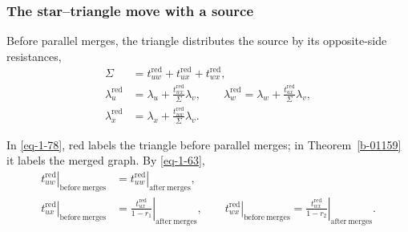 \documentclass[11pt]{article}
\numberwithin{equation}{section}
\numberwithin{figure}{section}
\numberwithin{table}{section}
\begin{document}
\subsubsection{The star--triangle move with a source}\label{sources-at-a-trivalent-vertex}

Before parallel merges, the triangle distributes the source by its opposite-side resistances,
\begin{equation}\label{eq-1-78}
\begin{aligned}
\Sigma&=t_{uw}^{\mathrm{red}}+t_{ux}^{\mathrm{red}}+t_{wx}^{\mathrm{red}},\\
\lambda_u^{\mathrm{red}}&=\lambda_u+\frac{t_{wx}^{\mathrm{red}}}{\Sigma}\lambda_v,\qquad
\lambda_w^{\mathrm{red}}=\lambda_w+\frac{t_{ux}^{\mathrm{red}}}{\Sigma}\lambda_v,\\
\lambda_x^{\mathrm{red}}&=\lambda_x+\frac{t_{uw}^{\mathrm{red}}}{\Sigma}\lambda_v.
\end{aligned}
\end{equation}

In \eqref{eq-1-78}, $\mathrm{red}$ labels the triangle before parallel merges; in Theorem~\ref{b-01159} it labels the merged graph. By \eqref{eq-1-63},
\begin{equation*}
\begin{aligned}
\left.t_{uw}^{\mathrm{red}}\right|_{\mathrm{before\ merges}}
&=\left.t_{uw}^{\mathrm{red}}\right|_{\mathrm{after\ merges}},\\
\left.t_{ux}^{\mathrm{red}}\right|_{\mathrm{before\ merges}}
&=\left.\frac{t_{ux}^{\mathrm{red}}}{1-r_1}\right|_{\mathrm{after\ merges}},\qquad
\left.t_{wx}^{\mathrm{red}}\right|_{\mathrm{before\ merges}}
=\left.\frac{t_{wx}^{\mathrm{red}}}{1-r_2}\right|_{\mathrm{after\ merges}}.
\end{aligned}
\end{equation*}
\end{document}
